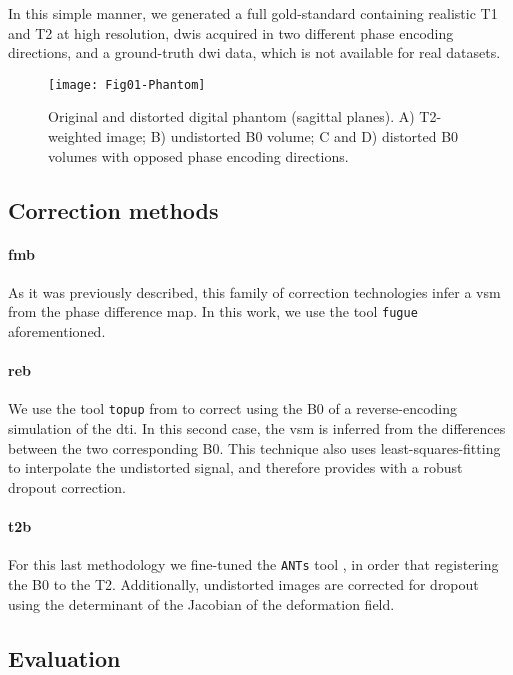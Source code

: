 In this simple manner, we generated a full gold-standard
containing realistic T1 and T2
at high resolution, \glspl*{dwi} acquired in two
different phase encoding directions, and a ground-truth
\gls*{dwi} data, which is not available for real datasets.


\begin{figure}[thpb]
   \centering
   \texttt{[image: Fig01-Phantom]}
   \caption{Original and distorted digital phantom (sagittal
   planes). A) T2-weighted image; B) undistorted B0 volume;
   C and D) distorted B0 volumes with opposed phase encoding 
   directions.}
   \label{fig:label}
\end{figure}

\subsection{Correction methods}

\paragraph*{\Gls*{fmb}} As it was previously described,
this family of correction technologies infer a \gls*{vsm}
from the phase difference map. In this work, we use the
tool \texttt{fugue} \cite{jenkinson_fsl_2012} aforementioned.

\paragraph*{\Gls*{reb}} We use the tool
\texttt{topup} from \cite{jenkinson_fsl_2012} to correct
using the B0 of a reverse-encoding simulation of the \gls*{dti}.
In this second case, the \gls*{vsm} is inferred from the
differences between the two corresponding B0. This technique
also uses least-squares-fitting to interpolate the undistorted
signal, and therefore provides with a robust dropout correction.

\paragraph*{\Gls*{t2b}} For this last methodology
we fine-tuned the \texttt{ANTs} tool \cite{avants_ants:_2013},
in order that registering the B0 to the T2. Additionally,
undistorted images are corrected for dropout using the determinant
of the Jacobian of the deformation field.

\subsection{Evaluation}

